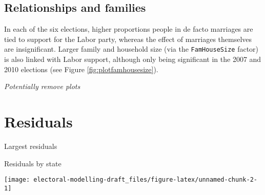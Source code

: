 \documentclass[openany]{book}
\begin{document}
\hypertarget{relationships-and-families}{%
\subsection{Relationships and families}\label{relationships-and-families}}

In each of the six elections, higher proportions people in de facto marriages are tied to support for the Labor party, whereas the effect of marriages themselves are insignificant. Larger family and household size (via the \texttt{FamHouseSize} factor) is also linked with Labor support, although only being significant in the 2007 and 2010 elections (see Figure \ref{fig:plotfamhousesize}).

\emph{Potentially remove plots}

\hypertarget{residuals}{%
\section{Residuals}\label{residuals}}

Largest residuals

Residuals by state

\begin{center}\texttt{[image: electoral-modelling-draft\_files/figure-latex/unnamed-chunk-2-1]} \end{center}


\end{document}
